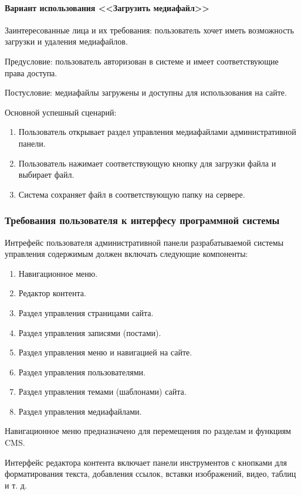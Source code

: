 \paragraph{Вариант использования <<Загрузить медиафайл>>}
Заинтересованные лица и их требования: пользователь хочет иметь возможность загрузки и удаления медиафайлов.

Предусловие: пользователь авторизован в системе и имеет соответствующие права доступа.

Постусловие: медиафайлы загружены и доступны для использования на сайте.

Основной успешный сценарий:
\begin{enumerate}
	\item Пользователь открывает раздел управления медиафайлами административной панели.
	\item Пользователь нажимает соответствующую кнопку для загрузки файла и выбирает файл.
	\item Система сохраняет файл в соответствующую папку на сервере.
\end{enumerate}

\subsubsection{Требования пользователя к интерфесу программной системы} \label{interface_requirements}
Интрефейс пользователя административной панели разрабатываемой системы управления содержимым должен включать следующие компоненты:
\begin{enumerate}
	\item Навигационное меню.
	\item Редактор контента.
	\item Раздел управления страницами сайта.
	\item Раздел управления записями (постами).
	\item Раздел управления меню и навигацией на сайте.
	\item Раздел управления пользователями.
	\item Раздел управления темами (шаблонами) сайта.
	\item Раздел управления медиафайлами.
\end{enumerate}

Навигационное меню предназначено для перемещения по разделам и функциям CMS.

Интерфейс редактора контента включает панели инструментов с кнопками для форматирования текста, добавления ссылок, вставки изображений, видео, таблиц и т. д.

